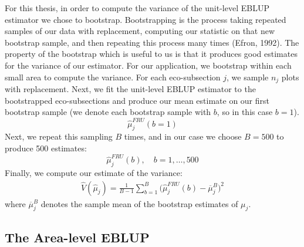 \documentclass[12pt,twoside]{reedthesis}
\begin{document}
For this thesis, in order to compute the variance of the unit-level EBLUP estimator we chose to bootstrap. Bootstrapping is the process taking repeated samples of our data with replacement, computing our statistic on that new bootstrap sample, and then repeating this process many times (Efron, 1992). The property of the bootstrap which is useful to us is that it produces good estimates for the variance of our estimator. For our application, we bootstrap within each small area to compute the variance. For each eco-subsection \(j\), we sample \(n_j\) plots with replacement. Next, we fit the unit-level EBLUP estimator to the bootstrapped eco-subsections and produce our mean estimate on our first bootstrap sample (we denote each bootstrap sample with \(b\), so in this case \(b=1\)).
\[
\hat\mu_j^{FRU}(b=1)
\]
Next, we repeat this sampling \(B\) times, and in our case we choose \(B = 500\) to produce 500 estimates:
\[
\hat\mu_j^{FRU}(b), \quad b = 1,\dots,500
\]
Finally, we compute our estimate of the variance:
\begin{align}
\hat V(\hat\mu_j) = \frac{1}{B-1} \sum_{b=1}^{B}\Big(\hat\mu^{FRU}_j(b) - \overline\mu_j^B\Big)^2
\end{align}
where \(\overline\mu_j^B\) denotes the sample mean of the bootstrap estimates of \(\mu_j\).

\hypertarget{the-area-level-eblup}{%
\subsection{The Area-level EBLUP}\label{the-area-level-eblup}}
\end{document}
